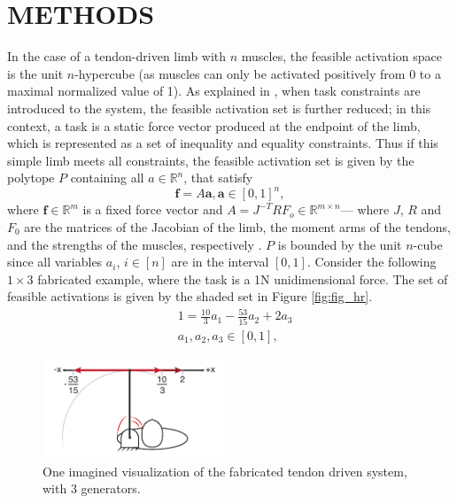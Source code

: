 \section{METHODS}
\label{s:methods}
In the case of a tendon-driven limb with $n$ muscles, the feasible activation space is the unit $n$-hypercube (as muscles can only be activated positively from 0 to a maximal normalized value of 1). As explained in \cite{Valero-Cuevas2009mathematical}, when task constraints are introduced to the system, the feasible activation set is further reduced; in this context, a task is a static force vector produced at the endpoint of the limb, which is represented as a set of inequality and equality constraints. Thus if this simple limb meets all constraints, the feasible activation set is given by the polytope $P$ containing all $a \in \mathbb{R}^n$, that satisfy
\[\textbf{f} = A\textbf{a}, \textbf{a} \in [0,1]^n,\]
where $\textbf{f} \in \mathbb{R}^m$ is a fixed force vector and $A = J^{-T}RF_o \in \mathbb{R}^{m \times n}$--- where $J$, $R$ and $F_0$ are the matrices of the Jacobian of the limb, the moment arms of the tendons, and the strengths of the muscles, respectively \cite{Valero-Cuevas1998Large,Valero-Cuevas2009mathematical}. 
$P$ is bounded by the unit $n$-cube since all variables $a_i$, $i \in [n]$ are in the interval $[0,1]$.
Consider the following $1 \times 3$ fabricated example, where the task is a 1N unidimensional force. The set of feasible activations is given by the shaded set in Figure \ref{fig:fig_hr}.
\begin{align*}
&1 = \frac{10}{3}a_1 - \frac{53}{15}a_2 + 2a_3 \\
&a_1, a_2, a_3 \in [0,1],
\end{align*}

\begin{figure}[schematic_arm]
  \label{fig:schematic_arm}
  \centering
  \includegraphics[width=0.5\textwidth]{figs/schematic_arm_1D.pdf}
  \caption{One imagined visualization of the fabricated tendon driven system, with 3 generators.}
  \label{fig:finger}
\end{figure}


